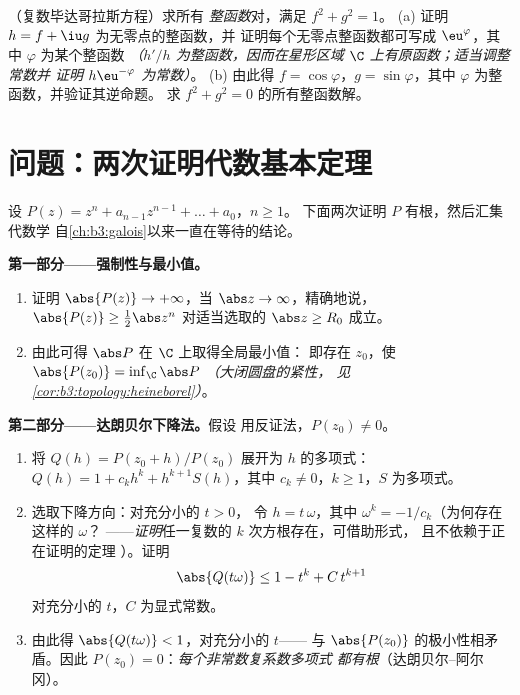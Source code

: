 \begin{exercise}[$\star\star$]\label{exo:b3:holomorphic:12}
（复数毕达哥拉斯方程）求所有
\emph{整函数}对，满足 $f^2 + g^2 = 1$。
(a) 证明 $h = f + \iu g$ 为无零点的整函数，并
证明每个无零点整函数都可写成 $\eu^{\varphi}$，其中
$\varphi$ 为某个整函数 \emph{（$h'/h$ 为整函数，因而在星形区域
$\C$ 上有原函数；适当调整常数并
证明 $h\eu^{-\varphi}$ 为常数）}。
(b) 由此得 $f = \cos\varphi$，$g = \sin\varphi$，其中
$\varphi$ 为整函数，并验证其逆命题。
求 $f^2 + g^2 = 0$ 的所有整函数解。
\end{exercise}

\section{问题：两次证明代数基本定理}

\begin{problem}\label{pb:b3:holomorphic:1}
设 $P(z) = z^n + a_{n-1}z^{n-1} + \dots + a_0$，$n \geq 1$。
下面两次证明 $P$ 有根，然后汇集代数学
自\cref{ch:b3:galois}以来一直在等待的结论。

\medskip
\noindent\textbf{第一部分——强制性与最小值。}
\begin{enumerate}
  \item 证明 $\abs{P(z)} \to +\infty$，当 $\abs z \to
        \infty$，精确地说，$\abs{P(z)} \geq \frac12\abs z^n$
        对适当选取的 $\abs z \geq R_0$ 成立。
  \item 由此可得 $\abs P$ 在 $\C$ 上取得全局最小值：
        即存在 $z_0$，使 $\abs{P(z_0)} = \inf_\C\abs P$
        \emph{（大闭圆盘的紧性，
        见\cref{cor:b3:topology:heineborel}）}。
\end{enumerate}

\medskip
\noindent\textbf{第二部分——达朗贝尔下降法。}假设
用反证法，$P(z_0) \neq 0$。
\begin{enumerate}[resume]
  \item 将 $Q(h) = P(z_0 + h)/P(z_0)$ 展开为
        $h$ 的多项式：$Q(h) = 1 + c_kh^k + h^{k+1}S(h)$，其中 $c_k \neq
        0$，$k \geq 1$，$S$ 为多项式。
  \item 选取下降方向：对充分小的 $t > 0$，
        令 $h = t\,\omega$，其中 $\omega^k = -1/c_k$（为何存在这样的 $\omega$？
——\emph{证明}任一复数的
        $k$ 次方根存在，可借助形式，
        且不依赖于正在证明的定理
        ）。证明
        \[
        \abs{Q(t\omega)} \leq 1 - t^k + C\,t^{k+1}
        \]
        对充分小的 $t$，$C$ 为显式常数。
  \item 由此得 $\abs{Q(t\omega)} < 1$，对充分小的 $t$——
        与 $\abs{P(z_0)}$ 的极小性相矛盾。因此
        $P(z_0) = 0$：\emph{每个非常数复系数多项式
        都有根}（达朗贝尔--阿尔冈）。
\end{enumerate}


\end{problem}
